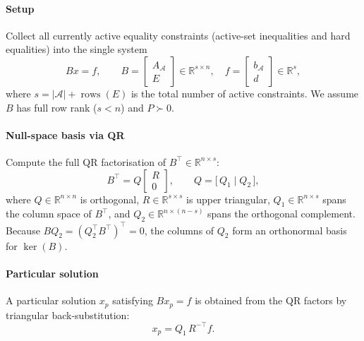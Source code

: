 \documentclass[11pt]{article}
\begin{document}
\paragraph{Setup}
Collect all currently active equality constraints (active-set inequalities and hard
equalities) into the single system
\begin{equation}\label{eq:combined}
B x = f, \qquad
B = \begin{bmatrix} A_\mathcal{A} \\ E \end{bmatrix} \in \mathbb{R}^{s \times n},\quad
f = \begin{bmatrix} b_\mathcal{A} \\ d \end{bmatrix} \in \mathbb{R}^{s},
\end{equation}
where $s = |\mathcal{A}| + \operatorname{rows}(E)$ is the total number of active
constraints. We assume $B$ has full row rank ($s < n$) and $P \succ 0$.

\paragraph{Null-space basis via QR}
Compute the full QR factorisation of $B^\top \in \mathbb{R}^{n \times s}$:
\begin{equation}\label{eq:qr}
B^\top = Q \begin{bmatrix} R \\ 0 \end{bmatrix},
\qquad Q = \bigl[\,Q_1 \;\big|\; Q_2\,\bigr],
\end{equation}
where $Q \in \mathbb{R}^{n \times n}$ is orthogonal, $R \in \mathbb{R}^{s \times s}$ is
upper triangular, $Q_1 \in \mathbb{R}^{n \times s}$ spans the column space of $B^\top$,
and $Q_2 \in \mathbb{R}^{n \times (n-s)}$ spans the orthogonal complement.
Because $B Q_2 = (Q_2^\top B^\top)^\top = 0$, the columns of $Q_2$ form an orthonormal
basis for $\ker(B)$.

\paragraph{Particular solution}
A particular solution $x_p$ satisfying $B x_p = f$ is obtained from the QR factors by
triangular back-substitution:
\[
x_p = Q_1\, R^{-\top} f.
\]
\end{document}
